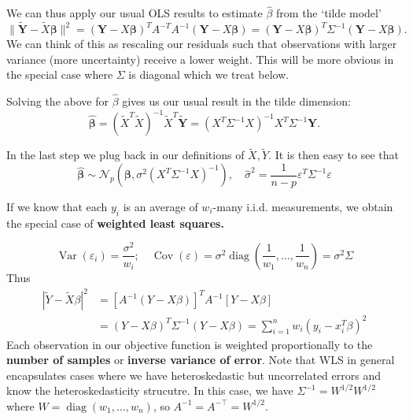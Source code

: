 \documentclass[11pt, %
	oneside, %
	english, %
	onehalfspacing, %
	]{article} %
\numberwithin{equation}{section}
\begin{document}
We can thus apply our usual OLS results to estimate $\hat{\beta}$ from the `tilde model'
\begin{equation*}
    \|\tilde{\mathbf{Y}}-\tilde{X} \mathbf{\beta}\|^2=(\mathbf{Y}-X \mathbf{\beta})^T A^{-T} A^{-1}(\mathbf{Y}-X \mathbf{\beta})=(\mathbf{Y}-X \mathbf{\beta})^T \Sigma^{-1}(\mathbf{Y}-X \mathbf{\beta}).
\end{equation*}
We can think of this as rescaling our residuals such that observations with larger variance (more uncertainty) receive a lower weight. This will be more obvious in the special case where $\Sigma$ is diagonal which we treat below.

Solving the above for $\hat{\beta}$ gives us our usual result in the tilde dimension:
 \begin{equation*}
    \widehat{\mathbf{\beta}}=\left(\tilde{X}^T \tilde{X}\right)^{-1} \tilde{X}^T \tilde{\mathbf{Y}}=\left(X^T \Sigma^{-1} X\right)^{-1} X^T \Sigma^{-1} \mathbf{Y}.
 \end{equation*}

 In the last step we plug back in our definitions of $\tilde{X}, \tilde{Y}$. It is then easy to see that
 \begin{equation*}
    \widehat{\mathbf{\beta}} \sim \mathcal{N}_p\left(\mathbf{\beta}, \sigma^2\left(X^T \Sigma^{-1} X\right)^{-1}\right), \quad \hat{\sigma}^2=\frac{1}{n-p} \varepsilon^T \Sigma^{-1} \varepsilon
 \end{equation*}

 If we know that each $y_i$ is an average of $w_i$-many i.i.d. measurements, we obtain the special case of \textbf{weighted least squares.}

 \begin{equation*}
    \operatorname{Var}\left(\varepsilon_i\right)=\frac{\sigma^2}{w_i} ; \quad \operatorname{Cov}(\varepsilon)=\sigma^2 \operatorname{diag}\left(\frac{1}{w_1}, \ldots, \frac{1}{w_n}\right)=\sigma^2 \Sigma
 \end{equation*}
 Thus
 \begin{align*}
    |\tilde{Y}-\tilde{X} \beta|^2&= \left[A^{-1}(Y-X \beta)\right]^T A^{-1} \left[Y-X \beta\right] \\
    &=(Y-X \beta)^T \Sigma^{-1}(Y-X \beta)=\sum_{i=1}^n w_i\left(y_i-x_i^T \beta\right)^2
 \end{align*}
 Each observation in our objective function is weighted proportionally to the \textbf{number of samples} or \textbf{inverse variance of error}. Note that WLS in general encapsulates cases where we have heteroskedastic but uncorrelated errors and know the heteroskedasticity strucutre. In this case, we have $\Sigma^{-1} = W^{1/2} W^{1/2}$ where $W = \operatorname{diag}(w_1, \ldots, w_n)$, so $A^{-1} = A^{-\top} = W^{1/2}$.
\end{document}
